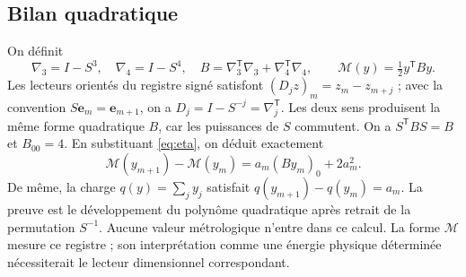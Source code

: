 \subsection{Bilan quadratique}
On définit
\[
\nabla_3=I-S^3,\quad \nabla_4=I-S^4,\quad
B=\nabla_3^{\mathsf T}\nabla_3+\nabla_4^{\mathsf T}\nabla_4,\qquad
\mathcal M(y)=\tfrac12 y^{\mathsf T}By.
\]
Les lecteurs orientés du registre signé satisfont
$(D_jz)_m=z_m-z_{m+j}$ ; avec la convention
$S\mathbf e_m=\mathbf e_{m+1}$, on a
$D_j=I-S^{-j}=\nabla_j^{\mathsf T}$. Les deux sens produisent la même
forme quadratique $B$, car les puissances de $S$ commutent.
On a $S^{\mathsf T}BS=B$ et $B_{00}=4$. En substituant
\eqref{eq:eta}, on déduit exactement
\begin{equation}
\mathcal M(y_{m+1})-\mathcal M(y_m)
=a_m(By_m)_0+2a_m^2.
\label{ii:mem:balance}
\end{equation}
De même, la charge $q(y)=\sum_jy_j$ satisfait
$q(y_{m+1})-q(y_m)=a_m$.
La preuve est le développement du polynôme quadratique après retrait de la
permutation $S^{-1}$. Aucune valeur métrologique n’entre dans ce calcul.
La forme $\mathcal M$ mesure ce registre ; son interprétation comme une
énergie physique déterminée nécessiterait le lecteur dimensionnel correspondant.




